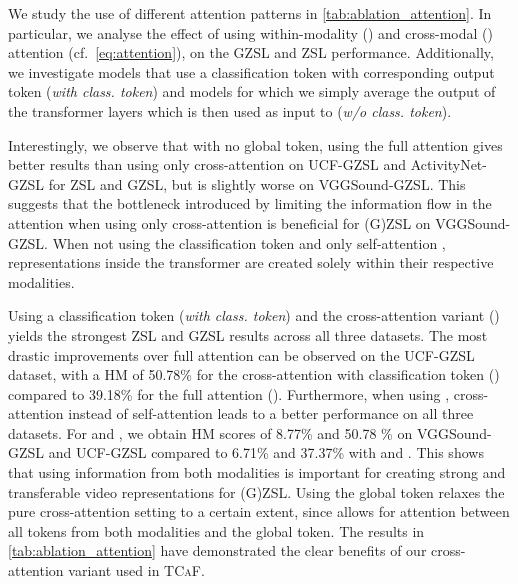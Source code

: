 \documentclass[runningheads]{llncs}
\newcommand{\mypara}[1]{\noindent{\bf{#1}}}
\newcommand{\modelName}{\textsc{TCaF}\xspace}
\newcommand{\activity}{{ActivityNet-GZSL}\xspace}
\newcommand{\ucf}{{UCF-GZSL}\xspace}
\newcommand{\vgg}{{VGGSound-GZSL}\xspace}
\begin{document}
\mypara{Comparing different attention variants.}
We study the use of different attention patterns in \cref{tab:ablation_attention}. In particular, we analyse the effect of using within-modality () and cross-modal () attention (cf.\ \cref{eq:attention}), on the GZSL and ZSL performance. Additionally, we investigate models that use a classification token  with corresponding output token  (\textit{with class. token}) and models for which we simply average the output of the transformer layers which is then used as input to  (\textit{w/o class. token}).

Interestingly, we observe that with no global token, using the full attention  gives better results than using only cross-attention on \ucf and \activity for ZSL and GZSL, but is slightly worse on \vgg. This suggests that the bottleneck introduced by limiting the information flow in the attention when using only cross-attention is beneficial for (G)ZSL on \vgg.
When not using the classification token and only self-attention , representations inside the transformer are created solely within their respective modalities. 

Using a classification token (\textit{with class. token}) and the cross-attention variant () yields the strongest ZSL and GZSL results across all three datasets. The most drastic improvements over full attention can be observed on the \ucf dataset, with a HM of 50.78\% for the cross-attention with classification token () compared to 39.18\% for the full attention ().
Furthermore, when using , cross-attention  instead of self-attention  leads to a better performance on all three datasets. For  and , we obtain HM scores of 8.77\% and 50.78 \% on \vgg and \ucf compared to 6.71\% and 37.37\% with  and . This shows that using information from both modalities is important for creating strong and transferable video representations for (G)ZSL.
Using the global token relaxes the pure cross-attention setting to a certain extent, since  allows for attention between all tokens from both modalities and the global token. The results in \cref{tab:ablation_attention} have demonstrated the clear benefits of our cross-attention variant used in \modelName.
\end{document}
